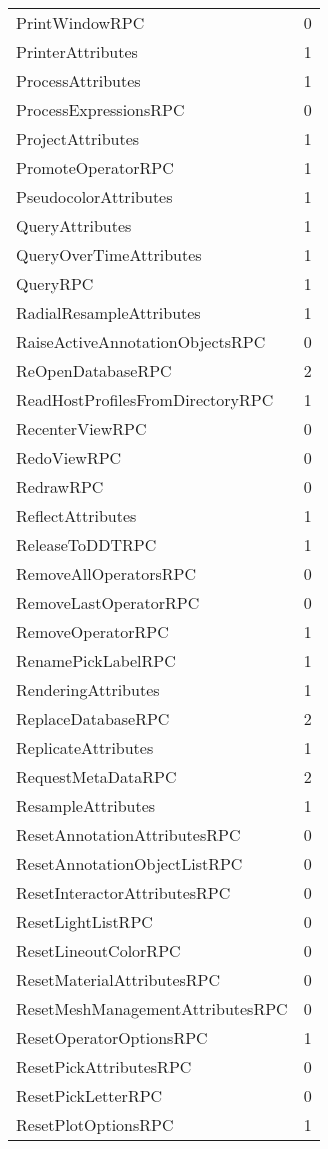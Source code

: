 \documentclass[10pt,a4paper]{report}
\begin{document}
\begin{longtable}{ll}
PrintWindowRPC & 0 \\
PrinterAttributes & 1 \\
ProcessAttributes & 1 \\
ProcessExpressionsRPC & 0 \\
ProjectAttributes & 1 \\
PromoteOperatorRPC & 1 \\
PseudocolorAttributes & 1 \\
QueryAttributes & 1 \\
QueryOverTimeAttributes & 1 \\
QueryRPC & 1 \\
RadialResampleAttributes & 1 \\
RaiseActiveAnnotationObjectsRPC & 0 \\
ReOpenDatabaseRPC & 2 \\
ReadHostProfilesFromDirectoryRPC & 1 \\
RecenterViewRPC & 0 \\
RedoViewRPC & 0 \\
RedrawRPC & 0 \\
ReflectAttributes & 1 \\
ReleaseToDDTRPC & 1 \\
RemoveAllOperatorsRPC & 0 \\
RemoveLastOperatorRPC & 0 \\
RemoveOperatorRPC & 1 \\
RenamePickLabelRPC & 1 \\
RenderingAttributes & 1 \\
ReplaceDatabaseRPC & 2 \\
ReplicateAttributes & 1 \\
RequestMetaDataRPC & 2 \\
ResampleAttributes & 1 \\
ResetAnnotationAttributesRPC & 0 \\
ResetAnnotationObjectListRPC & 0 \\
ResetInteractorAttributesRPC & 0 \\
ResetLightListRPC & 0 \\
ResetLineoutColorRPC & 0 \\
ResetMaterialAttributesRPC & 0 \\
ResetMeshManagementAttributesRPC & 0 \\
ResetOperatorOptionsRPC & 1 \\
ResetPickAttributesRPC & 0 \\
ResetPickLetterRPC & 0 \\
ResetPlotOptionsRPC & 1 \\

\end{longtable}
\end{document}

